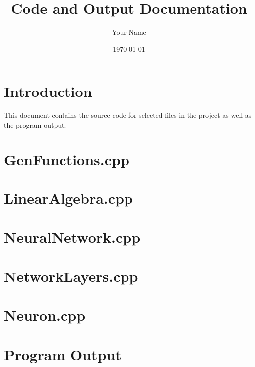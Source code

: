 \documentclass{article}
\title{Code and Output Documentation}
\author{Your Name}
\date{\today}
\begin{document}
\maketitle

\tableofcontents

\section{Introduction}
This document contains the source code for selected files in the project as well as the program output.


\section{GenFunctions.cpp}


\section{LinearAlgebra.cpp}


\section{NeuralNetwork.cpp}


\section{NetworkLayers.cpp}


\section{Neuron.cpp}


\section{Program Output}
\end{document}
